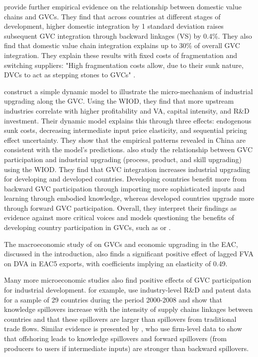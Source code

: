 \documentclass[a4paper]{article}
\begin{document}
 \citet{beverelli2019domestic} provide further empirical evidence on the relationship between domestic value chains and GVCs. They find that across countries at different stages of development, higher domestic integration by 1 standard deviation raises subsequent GVC integration through backward linkages (VS) by 0.4\%. They also find that domestic value chain integration explains up to 30\% of overall GVC integration. They explain these results with fixed costs of fragmentation and switching suppliers: "High fragmentation costs allow, due to their sunk nature, DVCs to act as stepping stones to GVCs" \citep{beverelli2019domestic}. \newline 
 
\citet{shen2021towards} construct a simple dynamic model to illustrate the micro-mechanism of industrial upgrading along the GVC. Using the WIOD, they find that more upstream industries correlate with higher profitability and VA, capital intensity, and R\&D investment. Their dynamic model explains this through three effects: endogenous sunk costs, decreasing intermediate input price elasticity, and sequential pricing effect uncertainty. They show that the empirical patterns revealed in China are consistent with the model's predictions. \citet{tian2022global} also study the relationship between GVC participation and industrial upgrading (process, product, and skill upgrading) using the WIOD. They find that GVC integration increases industrial upgrading for developing and developed countries. Developing countries benefit more from backward GVC participation through importing more sophisticated inputs and learning through embodied knowledge, whereas developed countries upgrade more through forward GVC participation. Overall, they interpret their findings as evidence against more critical voices and models questioning the benefits of developing country participation in GVCs, such as \citet{baldwin2014trade} or \citet{dalle2013industrial}. \newline

The macroeconomic study of \citet{lwesya2022integration} on GVCs and economic upgrading in the EAC, discussed in the introduction, also finds a significant positive effect of lagged FVA on DVA in EAC5 exports, with coefficients implying an elasticity of 0.49. \newline 

Many more microeconomic studies also find positive effects of GVC participation for industrial development. \citet{piermartini2014knowledge} for example, use industry-level R\&D and patent data for a sample of 29 countries during the period 2000-2008 and show that knowledge spillovers increase with the intensity of supply chains linkages between countries and that these spillovers are larger than spillovers from traditional trade flows. Similar evidence is presented by \citet{benz2015trade}, who use firm-level data to show that offshoring leads to knowledge spillovers and forward spillovers (from producers to users if intermediate inputs) are stronger than backward spillovers. \newline 
\end{document}
